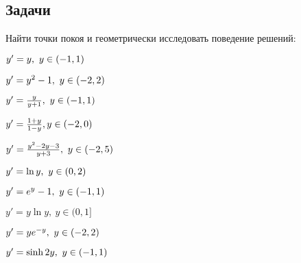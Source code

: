 \subsection{Задачи}

	Найти точки покоя и геометрически исследовать поведение решений:
	\begin{multicols}{2}
		\begin{enumtasks}
			
			\label{stability_zeros:geometrical}
			\item \( y' = y, ~ y \in \left( -1, 1 \right) \) %
			\item \( y' = y^2 - 1, ~ y \in \left( -2, 2 \right) \) %
			\item \( y' = \frac{y}{y + 1}, ~ y \in \left( -1, 1 \right) \) %
			\item \( y' = \frac{1 + y}{1 - y}, y \in \left( -2, 0 \right) \) %
			\item \( y' = \frac{y^2 - 2y - 3}{y + 3}, ~ y \in \left( -2, 5 \right) \) %
			\item \( y' = \ln{y}, ~ y \in \left( 0, 2 \right) \) %
			\item \( y' = e^y - 1, ~ y \in \left( -1, 1 \right) \) %
			\item \( y' = y \ln{y}, ~ y \in (0, 1] \) %
			\item \( y' = ye^{-y}, ~ y \in \left( -2, 2 \right) \) %
			\item \( y' = \sinh{2y}, ~ y \in \left( -1, 1 \right) \) %
			

\end{enumtasks}
\end{multicols}
